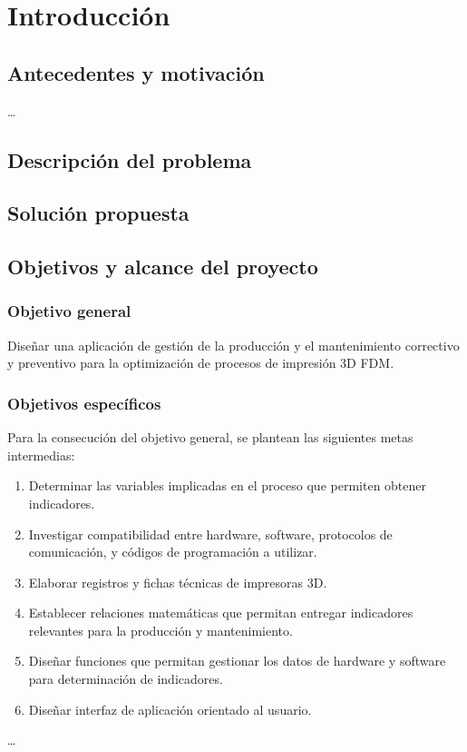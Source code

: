 \chapter{Introducci\'on}
\label{cap:intro}

\section{Antecedentes y motivaci\'on}
\label{intro:motivacion}

 \ldots 


\section{Descripci\'on del problema}
\label{intro:problema}



\section{Soluci\'on propuesta}
\label{intro:solucion}


\section{Objetivos y alcance del proyecto}
\label{intro:objetivos}

\subsection{Objetivo general}

Diseñar una aplicación de gestión de la producción y el mantenimiento correctivo y preventivo para la optimización de procesos de impresión 3D FDM.

\subsection{Objetivos espec\'ificos}

Para la consecución del objetivo general, se plantean las siguientes metas intermedias:

\begin{enumerate}
 
	\item Determinar las variables implicadas en el proceso que permiten obtener indicadores.
	\item Investigar compatibilidad entre hardware, software, protocolos de comunicación, y códigos de programación a utilizar.
	\item Elaborar registros y fichas técnicas de impresoras 3D.
	\item Establecer relaciones matemáticas que permitan entregar indicadores relevantes para la producción y mantenimiento.
	\item Diseñar funciones que permitan gestionar los datos de hardware y software para determinación de indicadores.
	\item Diseñar interfaz de aplicación orientado al usuario. 
	
\end{enumerate} \ldots 
